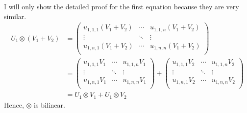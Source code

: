 \documentclass[12pt]{article}
\theoremstyle{definition}
\begin{document}
\begin{enumerate}
		I will only show the detailed proof for the first equation because they are very similar.
		\begin{align*}
			U_1 \otimes (V_1 + V_2)&=
			\begin{pmatrix}
				u_{1,1,1}(V_1+V_2) & \cdots & u_{1,1,n}(V_1+V_2) \\
				\vdots &  \ddots & \vdots \\
				u_{1,n,1}(V_1+V_2) & \cdots & u_{1,n,n}(V_1+V_2) \\
			\end{pmatrix}
			\\&=
			\begin{pmatrix}
				u_{1,1,1}V_1 & \cdots & u_{1,1,n}V_1 \\
				\vdots &  \ddots & \vdots \\
				u_{1,n,1}V_1 & \cdots & u_{1,n,n}V_1 \\
			\end{pmatrix}
			+
			\begin{pmatrix}
				u_{1,1,1}V_2 & \cdots & u_{1,1,n}V_2 \\
				\vdots &  \ddots & \vdots \\
				u_{1,n,1}V_2 & \cdots & u_{1,n,n}V_2 \\
			\end{pmatrix}
			\\&=U_1 \otimes V_1 +  U_1 \otimes V_2
		\end{align*}
		Hence, $\otimes$ is bilinear.
	\end{enumerate}
	
\end{document}
